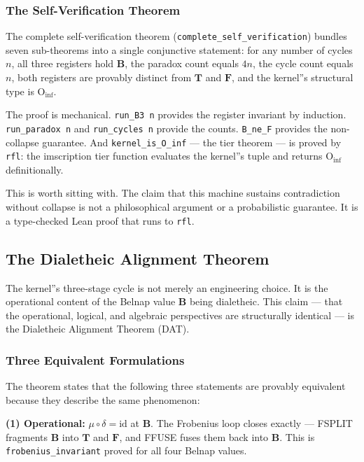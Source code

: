 \documentclass[12pt,a4paper]{article}
\begin{document}
\subsubsection{The Self-Verification Theorem}

The complete self-verification theorem (\texttt{complete\_self\_verification}) bundles seven sub-theorems into a single conjunctive statement: for any number of cycles $n$, all three registers hold $\mathbf{B}$, the paradox count equals $4n$, the cycle count equals $n$, both registers are provably distinct from $\mathbf{T}$ and $\mathbf{F}$, and the kernel''s structural type is $\text{O}_{\text{inf}}$.

The proof is mechanical. \texttt{run\_B3 n} provides the register invariant by induction. \texttt{run\_paradox n} and \texttt{run\_cycles n} provide the counts. \texttt{B\_ne\_F} provides the non-collapse guarantee. And \texttt{kernel\_is\_O\_inf} --- the tier theorem --- is proved by \texttt{rfl}: the imscription tier function evaluates the kernel''s tuple and returns $\text{O}_{\text{inf}}$ definitionally.

This is worth sitting with. The claim that this machine sustains contradiction without collapse is not a philosophical argument or a probabilistic guarantee. It is a type-checked Lean proof that runs to \texttt{rfl}.

\subsection{The Dialetheic Alignment Theorem}

The kernel''s three-stage cycle is not merely an engineering choice. It is the operational content of the Belnap value $\mathbf{B}$ being dialetheic. This claim --- that the operational, logical, and algebraic perspectives are structurally identical --- is the Dialetheic Alignment Theorem (DAT).

\subsubsection{Three Equivalent Formulations}

The theorem states that the following three statements are provably equivalent because they describe the same phenomenon:

\textbf{(1) Operational:} $\mu \circ \delta = \text{id}$ at $\mathbf{B}$. The Frobenius loop closes exactly --- FSPLIT fragments $\mathbf{B}$ into $\mathbf{T}$ and $\mathbf{F}$, and FFUSE fuses them back into $\mathbf{B}$. This is \texttt{frobenius\_invariant} proved for all four Belnap values.
\end{document}
